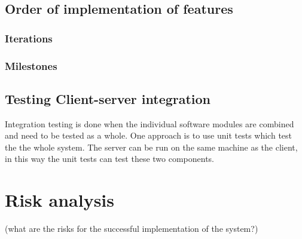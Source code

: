 \documentclass[a4paper]{article}
\begin{document}
\subsection{Order of implementation of features}

\subsubsection{Iterations}

\subsubsection{Milestones}




\subsection{Testing Client-server integration}
Integration testing is done when the individual software modules are combined and need to be tested as a whole. One approach is to use unit tests which test the the whole system. The server can be run on the same machine as the client, in this way the unit tests can test these two components.

\section{Risk analysis}
(what are the risks for the successful implementation of the system?)
\end{document}
